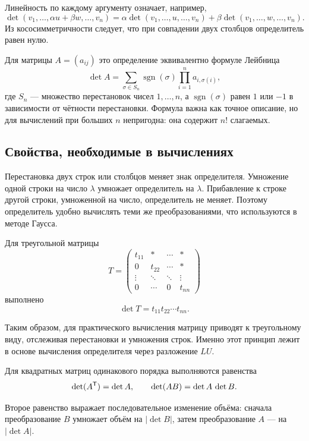 Линейность по каждому аргументу означает, например,
\[
\det(v_1,\dots,\alpha u+\beta w,\dots,v_n)
=
\alpha\det(v_1,\dots,u,\dots,v_n)
+
\beta\det(v_1,\dots,w,\dots,v_n).
\]
Из кососимметричности следует, что при совпадении двух столбцов определитель равен нулю.

Для матрицы \(A=(a_{ij})\) это определение эквивалентно формуле Лейбница
\[
\det A
=
\sum_{\sigma\in S_n}
\operatorname{sgn}(\sigma)
\prod_{i=1}^{n}a_{i,\sigma(i)},
\]
где \(S_n\) --- множество перестановок чисел \(1,\dots,n\), а \(\operatorname{sgn}(\sigma)\) равен \(1\) или \(-1\) в зависимости от чётности перестановки. Формула важна как точное описание, но для вычислений при больших \(n\) непригодна: она содержит \(n!\) слагаемых.

\subsection{Свойства, необходимые в вычислениях}

Перестановка двух строк или столбцов меняет знак определителя. Умножение одной строки на число \(\lambda\) умножает определитель на \(\lambda\). Прибавление к строке другой строки, умноженной на число, определитель не меняет. Поэтому определитель удобно вычислять теми же преобразованиями, что используются в методе Гаусса.

\begin{proposition}
Для треугольной матрицы
\[
T=\begin{pmatrix}
 t_{11}&*&\cdots&*\\
 0&t_{22}&\cdots&*\\
 \vdots&\ddots&\ddots&\vdots\\
 0&\cdots&0&t_{nn}
\end{pmatrix}
\]
выполнено
\[
\det T=t_{11}t_{22}\cdots t_{nn}.
\]
\end{proposition}

Таким образом, для практического вычисления матрицу приводят к треугольному виду, отслеживая перестановки и умножения строк. Именно этот принцип лежит в основе вычисления определителя через разложение \(LU\).

\begin{theorem}
Для квадратных матриц одинакового порядка выполняются равенства
\[
\det(A^{\mathsf{T}})=\det A,
\qquad
\det(AB)=\det A\,\det B.
\]
\end{theorem}

Второе равенство выражает последовательное изменение объёма: сначала преобразование \(B\) умножает объём на \(\lvert\det B\rvert\), затем преобразование \(A\) --- на \(\lvert\det A\rvert\).

